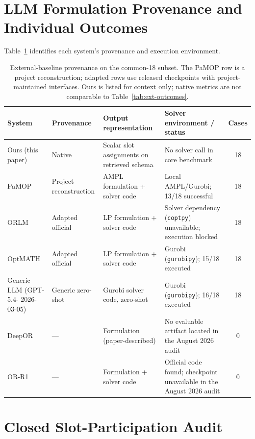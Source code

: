 \documentclass[pdflatex,sn-basic,Numbered]{sn-jnl}
\renewcommand{\arraystretch}{1.18}
\begin{document}
\section{LLM Formulation Provenance and Individual Outcomes}
\label{app:common18}

Table~\ref{tab:ext-context} identifies each system's provenance and execution environment.
\begin{table}[htbp]
  \centering
  \caption{External-baseline provenance on the common-18 subset. The PaMOP row is a project reconstruction; adapted rows use released checkpoints with project-maintained interfaces. Ours is listed for context only; native metrics are not comparable to Table~\ref{tab:ext-outcomes}.}
  \label{tab:ext-context}
  \small
  \setlength{\tabcolsep}{3pt}
  \renewcommand{\arraystretch}{1.15}
  \begin{tabular}{@{}>{\raggedright\arraybackslash}p{1.9cm}>{\raggedright\arraybackslash}p{2.6cm}>{\raggedright\arraybackslash}p{2.5cm}>{\raggedright\arraybackslash}p{3.55cm}c@{}}
    \toprule
    System & Provenance & Output representation & Solver environment / status & Cases \\
    \midrule
    Ours (this paper) & Native & Scalar slot assignments on retrieved schema & No solver call in core benchmark & 18 \\
    PaMOP \cite{pan2025pamop} & Project reconstruction & AMPL formulation + solver code & Local AMPL/Gurobi; 13/18 successful & 18 \\
    ORLM \cite{huang2025orlm} & Adapted official & LP formulation + solver code & Solver dependency (\texttt{coptpy}) unavailable; execution blocked & 18 \\
    OptMATH \cite{lu2025optmath} & Adapted official & LP formulation + solver code & Gurobi (\texttt{gurobipy}); 15/18 executed & 18 \\
    Generic LLM (GPT-5.4- 2026-03-05) & Generic zero-shot & Gurobi solver code, zero-shot & Gurobi (\texttt{gurobipy}); 16/18 executed & 18 \\
    DeepOR \cite{xiao2026deepor} & --- & Formulation (paper-described) & No evaluable artifact located in the August 2026 audit & 0 \\
    OR-R1 \cite{ding2026orr1} & --- & Formulation + solver code & Official code found; checkpoint unavailable in the August 2026 audit & 0 \\
    \bottomrule
  \end{tabular}
\end{table}

\section{Closed Slot-Participation Audit}
\label{app:g3}

\end{document}
